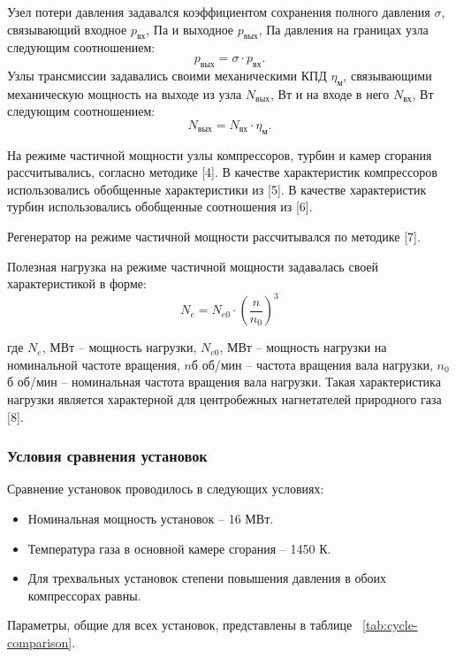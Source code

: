 Узел потери давления задавался коэффициентом сохранения полного давления $\sigma$, связывающий входное $p_{вх}$, Па и выходное $p_{вых}$, Па давления на границах узла следующим соотношением:
$$
	p_{вых} = \sigma \cdot p_{вх}.
$$
Узлы трансмиссии задавались своими механическими КПД $\eta_м$, связывающими механическую мощность на выходе из узла $N_{вых}$, Вт и на входе в него $N_{вх}$, Вт следующим соотношением:
$$
	N_{вых} = N_{вх} \cdot \eta_м.
$$

На режиме частичной мощности узлы компрессоров, турбин и камер сгорания рассчитывались, согласно методике [4]. В качестве характеристик компрессоров использовались обобщенные характеристики из [5]. В качестве характеристик турбин использовались обобщенные соотношения из [6].

Регенератор на режиме частичной мощности рассчитывался по методике [7].

Полезная нагрузка на режиме частичной мощности задавалась своей характеристикой в форме:
$$
	N_e = N_{e0} \cdot \left( \frac{n}{n_0} \right)^3
$$

где $N_e$, МВт – мощность нагрузки, $N_{e0}$, МВт – мощность нагрузки на номинальной частоте вращения,  $n$б об/мин – частота вращения вала нагрузки, $n_0$б об/мин – номинальная частота вращения вала нагрузки. Такая характеристика нагрузки является характерной для центробежных нагнетателей природного газа [8].

\subsubsection{Условия сравнения установок}

Сравнение установок проводилось в следующих условиях:
\begin{itemize}
	\item Номинальная мощность установок – 16 МВт.
	\item Температура газа в основной камере сгорания – 1450 К.
	\item Для трехвальных установок степени повышения давления в обоих компрессорах равны.
\end{itemize}

Параметры, общие для всех установок, представлены в таблице ~\ref{tab:cycle-comparison}.

